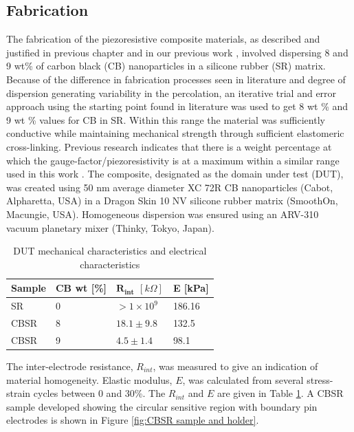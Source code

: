 \subsection{Fabrication} \label{sec:Fabrication}
The fabrication of the piezoresistive composite materials, as described and justified in previous chapter and in our previous work \citep{Ellingham2021}, involved dispersing 8 and 9 wt\% of carbon black (CB) nanoparticles in a silicone rubber (SR) matrix. Because of the difference in fabrication processes seen in literature \cite{D'Asaro2017, Shang2016} and degree of dispersion generating variability in the percolation, an iterative trial and error approach using the starting point found in literature was used to get 8 wt \% and 9 wt \% values for CB in SR. Within this range the material was sufficiently conductive while maintaining mechanical strength through sufficient elastomeric cross-linking. Previous research indicates that there is a weight percentage at which the gauge-factor/piezoresistivity is at a maximum within a similar range used in this work \cite{Dong2017, Yang2020}. The composite, designated as the domain under test (DUT), was created using 50 nm average diameter XC 72R CB nanoparticles (Cabot, Alpharetta, USA) in a Dragon Skin 10 NV silicone rubber matrix (SmoothOn, Macungie, USA). Homogeneous dispersion was ensured using an ARV-310 vacuum planetary mixer (Thinky, Tokyo, Japan).
\begin{table}[H]
\caption{DUT mechanical characteristics and electrical characteristics}
\label{tab:DUT_char}
\begin{center}
\begin{tabular}{llll}
\hline
\textbf{Sample}            & \textbf{CB wt} {[}\%{]}    & $\mathbf{R_{int}}$ $[k\Omega]$ & \textbf{E} {[}kPa{]}\\ \hline%
SR        & 0        &         $>1\times10^9$        &       186.16\\
CBSR        & 8        &         $18.1\pm9.8$          &       132.5\\
CBSR        & 9        &         $4.5\pm1.4$           &       98.1\\
\hline
\end{tabular}
\end{center}
\end{table}
The inter-electrode resistance, $R_{int}$, was measured to give an indication of material homogeneity. Elastic modulus, $E$, was calculated from several stress-strain cycles between 0 and 30\%. The $R_{int}$ and $E$ are given in Table \ref{tab:DUT_char}. A CBSR sample developed showing the circular sensitive region with boundary pin electrodes is shown in Figure \ref{fig:CBSR sample and holder}.
